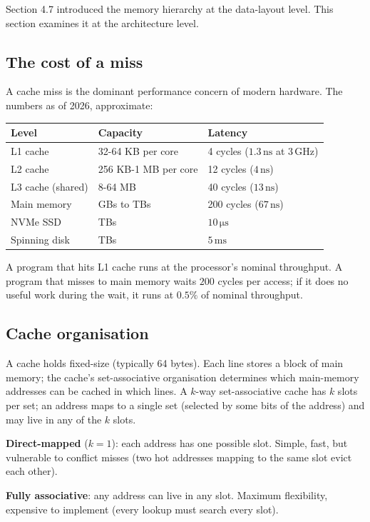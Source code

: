 Section 4.7 introduced the memory hierarchy at the data-layout level. This section examines it at the architecture level.

\subsection{The cost of a miss}

A cache miss is the dominant performance concern of modern hardware. The numbers as of 2026, approximate:

\begin{tabular}{lll}
\toprule
Level & Capacity & Latency \\
\midrule
L1 cache & 32-64 KB per core & 4 cycles ($1.3\,\si{\nano\second}$ at $3\,\si{\giga\hertz}$) \\
L2 cache & 256 KB-1 MB per core & 12 cycles ($4\,\si{\nano\second}$) \\
L3 cache (shared) & 8-64 MB & 40 cycles ($13\,\si{\nano\second}$) \\
Main memory & GBs to TBs & 200 cycles ($67\,\si{\nano\second}$) \\
NVMe SSD & TBs & $10\,\si{\micro\second}$ \\
Spinning disk & TBs & $5\,\si{\milli\second}$ \\
\bottomrule
\end{tabular}

A program that hits L1 cache runs at the processor's nominal throughput. A program that misses to main memory waits $200$ cycles per access; if it does no useful work during the wait, it runs at $0.5\%$ of nominal throughput.

\subsection{Cache organisation}

A cache holds fixed-size  (typically 64 bytes). Each line stores a block of main memory; the cache's set-associative organisation determines which main-memory addresses can be cached in which lines. A $k$-way set-associative cache has $k$ slots per set; an address maps to a single set (selected by some bits of the address) and may live in any of the $k$ slots.

\textbf{Direct-mapped} ($k=1$): each address has one possible slot. Simple, fast, but vulnerable to conflict misses (two hot addresses mapping to the same slot evict each other).

\textbf{Fully associative}: any address can live in any slot. Maximum flexibility, expensive to implement (every lookup must search every slot).

